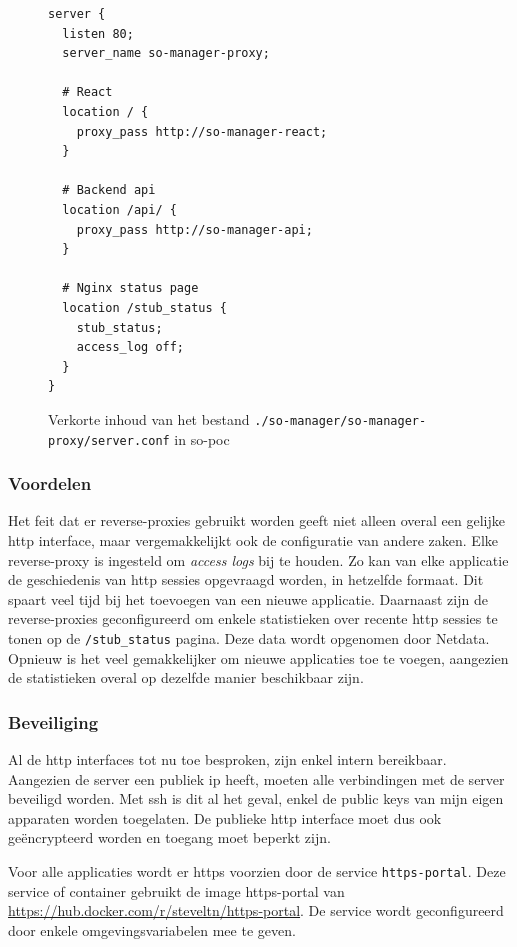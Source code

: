 \documentclass[a4paper,12pt]{report}
\begin{document}
\begin{figure}[H]
  \begin{lstlisting}
server {
  listen 80;
  server_name so-manager-proxy;

  # React
  location / {
    proxy_pass http://so-manager-react;
  }

  # Backend api
  location /api/ {
    proxy_pass http://so-manager-api;
  }

  # Nginx status page
  location /stub_status {
    stub_status;
    access_log off;
  }
}
  \end{lstlisting}
  \caption{Verkorte inhoud van het bestand \lstinline|./so-manager/so-manager-proxy/server.conf| in so-poc}
  \label{fig:proxy-voorbeeld-server-conf}
\end{figure}


\subsubsection{Voordelen}
Het feit dat er reverse-proxies gebruikt worden geeft niet alleen overal een gelijke http interface, maar vergemakkelijkt ook de configuratie van andere zaken.
Elke reverse-proxy is ingesteld om \emph{access logs} bij te houden.
Zo kan van elke applicatie de geschiedenis van http sessies opgevraagd worden, in hetzelfde formaat.
Dit spaart veel tijd bij het toevoegen van een nieuwe applicatie.
Daarnaast zijn de reverse-proxies geconfigureerd om enkele statistieken over recente http sessies te tonen op de \lstinline|/stub_status| pagina.
Deze data wordt opgenomen door Netdata.
Opnieuw is het veel gemakkelijker om nieuwe applicaties toe te voegen, aangezien de statistieken overal op dezelfde manier beschikbaar zijn.

\subsubsection{Beveiliging}
Al de http interfaces tot nu toe besproken, zijn enkel intern bereikbaar.
Aangezien de server een publiek ip heeft, moeten alle verbindingen met de server beveiligd worden.
Met ssh is dit al het geval, enkel de public keys van mijn eigen apparaten worden toegelaten.
De publieke http interface moet dus ook geëncrypteerd worden en toegang moet beperkt zijn.

Voor alle applicaties wordt er https voorzien door de service \lstinline|https-portal|.
Deze service of container gebruikt de image https-portal van \url{https://hub.docker.com/r/steveltn/https-portal}.
De service wordt geconfigureerd door enkele omgevingsvariabelen mee te geven.
\end{document}
